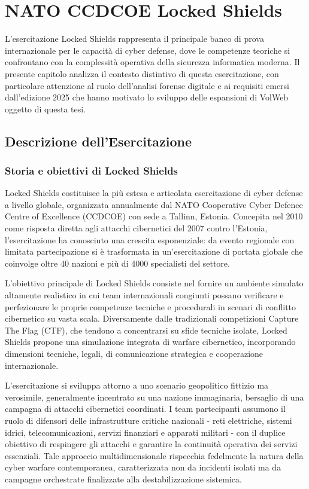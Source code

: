 \chapter{NATO CCDCOE Locked Shields}

L'esercitazione Locked Shields \cite{ccdcoe2025} rappresenta il principale banco di prova internazionale per le capacità di cyber defense, dove le competenze teoriche si confrontano con la complessità operativa della sicurezza informatica moderna. Il presente capitolo analizza il contesto distintivo di questa esercitazione, con particolare attenzione al ruolo dell'analisi forense digitale e ai requisiti emersi dall'edizione 2025 che hanno motivato lo sviluppo delle espansioni di VolWeb oggetto di questa tesi.

\section{Descrizione dell'Esercitazione}

\subsection{Storia e obiettivi di Locked Shields}

Locked Shields costituisce la più estesa e articolata esercitazione di cyber defense a livello globale, organizzata annualmente dal NATO Cooperative Cyber Defence Centre of Excellence (CCDCOE) con sede a Tallinn, Estonia. Concepita nel 2010 come risposta diretta agli attacchi cibernetici del 2007 contro l'Estonia, l'esercitazione ha conosciuto una crescita esponenziale: da evento regionale con limitata partecipazione si è trasformata in un'esercitazione di portata globale che coinvolge oltre 40 nazioni e più di 4000 specialisti del settore.

L'obiettivo principale di Locked Shields consiste nel fornire un ambiente simulato altamente realistico in cui team internazionali congiunti possano verificare e perfezionare le proprie competenze tecniche e procedurali in scenari di conflitto cibernetico su vasta scala. Diversamente dalle tradizionali competizioni Capture The Flag (CTF), che tendono a concentrarsi su sfide tecniche isolate, Locked Shields propone una simulazione integrata di warfare cibernetico, incorporando dimensioni tecniche, legali, di comunicazione strategica e cooperazione internazionale.

L'esercitazione si sviluppa attorno a uno scenario geopolitico fittizio ma verosimile, generalmente incentrato su una nazione immaginaria, bersaglio di una campagna di attacchi cibernetici coordinati. I team partecipanti assumono il ruolo di difensori delle infrastrutture critiche nazionali - reti elettriche, sistemi idrici, telecomunicazioni, servizi finanziari e apparati militari - con il duplice obiettivo di respingere gli attacchi e garantire la continuità operativa dei servizi essenziali. Tale approccio multidimensionale rispecchia fedelmente la natura della cyber warfare contemporanea, caratterizzata non da incidenti isolati ma da campagne orchestrate finalizzate alla destabilizzazione sistemica.

